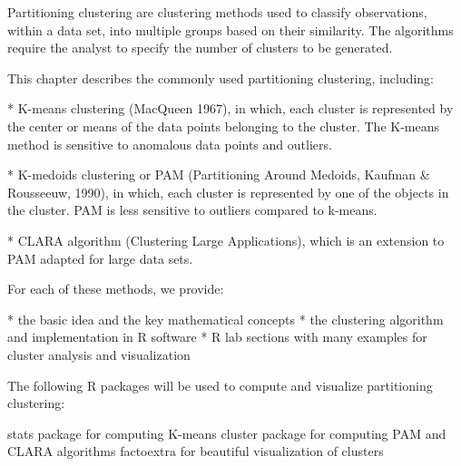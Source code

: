 Partitioning clustering are clustering methods used to classify observations, within a data set, into multiple groups based on their similarity. The algorithms require the analyst to specify the number of clusters to be generated.

This chapter describes the commonly used partitioning clustering, including:

* K-means clustering (MacQueen 1967), in which, each cluster is represented by the center or means of the data points belonging to the cluster. The K-means method is sensitive to anomalous data points and outliers.

* K-medoids clustering or PAM (Partitioning Around Medoids, Kaufman & Rousseeuw, 1990), in which, each cluster is represented by one of the objects in the cluster. PAM is less sensitive to outliers compared to k-means.

* CLARA algorithm (Clustering Large Applications), which is an extension to PAM adapted for large data sets.

For each of these methods, we provide:

* the basic idea and the key mathematical concepts
* the clustering algorithm and implementation in R software
* R lab sections with many examples for cluster analysis and visualization

The following R packages will be used to compute and visualize partitioning clustering:

stats package for computing K-means
cluster package for computing PAM and CLARA algorithms
factoextra for beautiful visualization of clusters
